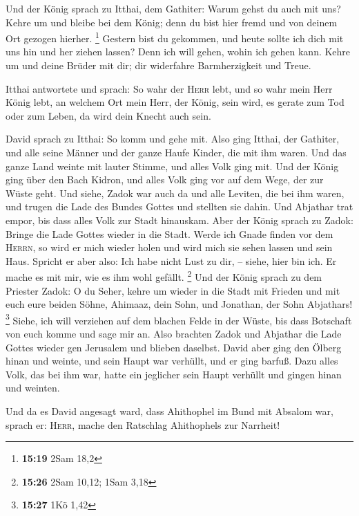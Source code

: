  Und der König sprach zu Itthai, dem Gathiter: Warum
gehst du auch mit uns? Kehre um und bleibe bei dem König; denn du bist
hier fremd und von deinem Ort gezogen hierher. \footnote{\textbf{15:19}
  2Sam 18,2}  Gestern bist du gekommen, und heute sollte
ich dich mit uns hin und her ziehen lassen? Denn ich will gehen, wohin
ich gehen kann. Kehre um und deine Brüder mit dir; dir widerfahre
Barmherzigkeit und Treue.

 Itthai antwortete und sprach: So wahr der \textsc{Herr}
lebt, und so wahr mein Herr König lebt, an welchem Ort mein Herr, der
König, sein wird, es gerate zum Tod oder zum Leben, da wird dein Knecht
auch sein.

 David sprach zu Itthai: So komm und gehe mit. Also ging
Itthai, der Gathiter, und alle seine Männer und der ganze Haufe Kinder,
die mit ihm waren.  Und das ganze Land weinte mit lauter
Stimme, und alles Volk ging mit. Und der König ging über den Bach
Kidron, und alles Volk ging vor auf dem Wege, der zur Wüste geht.
 Und siehe, Zadok war auch da und alle Leviten, die bei
ihm waren, und trugen die Lade des Bundes Gottes und stellten sie dahin.
Und Abjathar trat empor, bis dass alles Volk zur Stadt hinauskam.
 Aber der König sprach zu Zadok: Bringe die Lade Gottes
wieder in die Stadt. Werde ich Gnade finden vor dem \textsc{Herrn}, so
wird er mich wieder holen und wird mich sie sehen lassen und sein Haus.
 Spricht er aber also: Ich habe nicht Lust zu dir, --
siehe, hier bin ich. Er mache es mit mir, wie es ihm wohl gefällt.
\footnote{\textbf{15:26} 2Sam 10,12; 1Sam 3,18}  Und der
König sprach zu dem Priester Zadok: O du Seher, kehre um wieder in die
Stadt mit Frieden und mit euch eure beiden Söhne, Ahimaaz, dein Sohn,
und Jonathan, der Sohn Abjathars! \footnote{\textbf{15:27} 1Kö 1,42}
 Siehe, ich will verziehen auf dem blachen Felde in der
Wüste, bis dass Botschaft von euch komme und sage mir an.
 Also brachten Zadok und Abjathar die Lade Gottes wieder
gen Jerusalem und blieben daselbst.  David aber ging den
Ölberg hinan und weinte, und sein Haupt war verhüllt, und er ging
barfuß. Dazu alles Volk, das bei ihm war, hatte ein jeglicher sein Haupt
verhüllt und gingen hinan und weinten.

 Und da es David angesagt ward, dass Ahithophel im Bund
mit Absalom war, sprach er: \textsc{Herr}, mache den Ratschlag
Ahithophels zur Narrheit!

